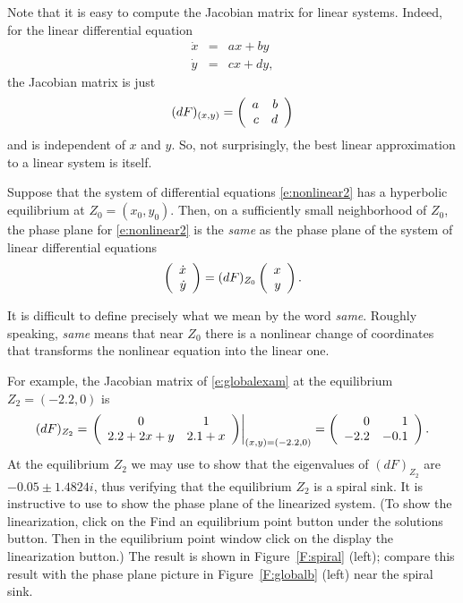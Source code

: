 \documentclass{ximera}
\begin{document}
Note that it is easy to compute the Jacobian matrix for linear 
systems.  Indeed, for the linear differential equation
\begin{eqnarray*}
\dot{x} & = & ax+by \\ \dot{y} & = & cx+dy,
\end{eqnarray*}
the Jacobian matrix is just 
\[
(dF)_{(x,y)} = \left(\begin{array}{rr} a & b\\ c &d\end{array}\right)
\]
and is independent of $x$ and $y$.  So, not surprisingly, the 
best linear approximation to a linear system is itself.

\begin{theorem} \label{T:linearization} 
Suppose that the system of differential equations
\eqref{e:nonlinear2} has a hyperbolic equilibrium at
$Z_0=(x_0,y_0)$.  Then, on a sufficiently small neighborhood of
$Z_0$, the phase plane for \eqref{e:nonlinear2} is the {\em
same\/} as the phase plane of the system of 
linear differential equations
\begin{equation}  \label{e:linearizedeqn}
\left(\begin{array}{r} \dot{x} \\ \dot{y}\end{array}\right) = (dF)_{Z_0} \left(\begin{array}{r} x \\ y\end{array}\right).
\end{equation}
\end{theorem}  
It is difficult to define precisely what we mean by the word
{\em same\/}. Roughly speaking, {\em same\/} means that near 
$Z_0$ there is a nonlinear change of coordinates that 
transforms the nonlinear equation into the linear one.

For example, the Jacobian matrix of \eqref{e:globalexam} at the
equilibrium $Z_2=(-2.2,0)$ is 
\[
(dF)_{Z_2} = \left.\left(\begin{array}{cc} 0 & 1\\ 2.2+2x+y &2.1+x\end{array}\right)\right|_{(x,y)=(-2.2,0)} 
= \left(\begin{array}{rr} 0 & 1\\ -2.2 &-0.1\end{array}\right).
\]
At the equilibrium $Z_2$ we may use \Matlab to show that the 
eigenvalues of $(dF)_{Z_2}$ are $-0.05\pm 1.4824i$, thus verifying 
that the equilibrium $Z_2$ is a spiral sink.  
It is instructive to use {\pplane} to 
show the phase plane of 
the linearized system.  
(To show the linearization, click on the 
{\sf Find an equilibrium point} button under the {\sf solutions} 
button.  Then in the {\sf \PPLANE equilibrium point} window click 
on the {\sf display the linearization} button.)  The result is
shown in Figure~\ref{F:spiral} (left); compare this result 
with the phase plane picture in Figure~\ref{F:globalb} (left) 
near the spiral sink.
\end{document}
